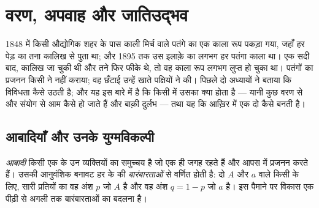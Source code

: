\chapter{वरण, अपवाह और जातिउद्भव}\label{ch:g12:selection-drift-speciation}

1848 में किसी औद्योगिक शहर के पास काली मिर्च वाले पतंगे का एक काला रूप
पकड़ा गया, जहाँ हर पेड़ का तना कालिख से पुता था; और 1895 तक उस इलाक़े का
लगभग हर पतंगा काला था। एक सदी बाद, कालिख जा चुकी थी और तने फिर फीके थे, तो
वह काला रूप लगभग लुप्त हो चुका था। पतंगों का प्रजनन किसी ने नहीं कराया; वह
छँटाई उन्हें खाते पक्षियों ने की। पिछले दो अध्यायों ने बताया कि विविधता
कैसे उठती है; और यह इस बारे में है कि किसी  में उसका क्या होता है ---
यानी कुछ  वरण से और संयोग से आम कैसे हो जाते हैं और बाक़ी
दुर्लभ --- तथा यह कि आख़िर में एक  दो  कैसे बनती है।

\section{आबादियाँ और उनके युग्मविकल्पी}

\begin{definition}[आबादी, युग्मविकल्पी बारंबारता]\label{def:g12:selection-drift-speciation:population}
\emph{आबादी} किसी एक  के उन व्यक्तियों का समुच्चय है जो
एक ही जगह रहते हैं और आपस में प्रजनन करते हैं। उसकी आनुवंशिक बनावट हर 
के  की \emph{बारंबारताओं}
से वर्णित होती है: दो  $A$ और $a$ वाले किसी 
के लिए, सारी प्रतियों का वह अंश $p$ जो $A$ है और वह अंश $q = 1 - p$ जो $a$
है। इस पैमाने पर विकास एक पीढ़ी से अगली तक  बारंबारताओं का
बदलना है।
\end{definition}

